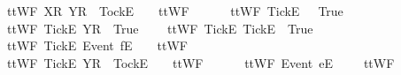 \ \ {\isachardoublequoteopen}ttWF{}\ {\isacharbrackleft}{\isacharbrackleft}X{\isacharbrackright}\isactrlsub R{\isacharbrackright}\ {\isacharparenleft}{\isacharbrackleft}Y{\isacharbrackright}\isactrlsub R\ {\isacharhash}\ {\isacharbrackleft}Tock{\isacharbrackright}\isactrlsub E\ {\isacharhash}\ {\isasymsigma}{\isacharparenright}\ {\isacharequal}\ ttWF{}\ {\isacharbrackleft}{\isacharbrackright}\ {\isasymsigma}{\isachardoublequoteclose}\ {\isacharbar}\ \isanewline
\ \ {\isachardoublequoteopen}ttWF{}\ {\isacharbrackleft}{\isacharbrackleft}Tick{\isacharbrackright}\isactrlsub E{\isacharbrackright}\ {\isacharbrackleft}{\isacharbrackright}\ {\isacharequal}\ True{\isachardoublequoteclose}\ {\isacharbar}\ \isanewline
\ \ {\isachardoublequoteopen}ttWF{}\ {\isacharbrackleft}{\isacharbrackleft}Tick{\isacharbrackright}\isactrlsub E{\isacharbrackright}\ {\isacharbrackleft}{\isacharbrackleft}Y{\isacharbrackright}\isactrlsub R{\isacharbrackright}\ {\isacharequal}\ True{\isachardoublequoteclose}\ {\isacharbar}\ \isanewline
\ \ {\isachardoublequoteopen}ttWF{}\ {\isacharbrackleft}{\isacharbrackleft}Tick{\isacharbrackright}\isactrlsub E{\isacharbrackright}\ {\isacharbrackleft}{\isacharbrackleft}Tick{\isacharbrackright}\isactrlsub E{\isacharbrackright}\ {\isacharequal}\ True{\isachardoublequoteclose}\ {\isacharbar}\ \isanewline
\ \ {\isachardoublequoteopen}ttWF{}\ {\isacharbrackleft}{\isacharbrackleft}Tick{\isacharbrackright}\isactrlsub E{\isacharbrackright}\ {\isacharparenleft}{\isacharbrackleft}Event\ f{\isacharbrackright}\isactrlsub E\ {\isacharhash}\ {\isasymsigma}{\isacharparenright}\ {\isacharequal}\ ttWF{}\ {\isacharbrackleft}{\isacharbrackright}\ {\isasymsigma}{\isachardoublequoteclose}\ {\isacharbar}\ \isanewline
\ \ {\isachardoublequoteopen}ttWF{}\ {\isacharbrackleft}{\isacharbrackleft}Tick{\isacharbrackright}\isactrlsub E{\isacharbrackright}\ {\isacharparenleft}{\isacharbrackleft}Y{\isacharbrackright}\isactrlsub R\ {\isacharhash}\ {\isacharbrackleft}Tock{\isacharbrackright}\isactrlsub E\ {\isacharhash}\ {\isasymsigma}{\isacharparenright}\ {\isacharequal}\ ttWF{}\ {\isacharbrackleft}{\isacharbrackright}\ {\isasymsigma}{\isachardoublequoteclose}\ {\isacharbar}\ \isanewline
\ \ {\isachardoublequoteopen}ttWF{}\ {\isacharparenleft}{\isacharbrackleft}Event\ e{\isacharbrackright}\isactrlsub E\ {\isacharhash}\ {\isasymsigma}{\isacharparenright}\ {\isacharbrackleft}{\isacharbrackright}\ {\isacharequal}\ ttWF{}\ {\isasymsigma}\ {\isacharbrackleft}{\isacharbrackright}{\isachardoublequoteclose}\ {\isacharbar}\ \isanewline
